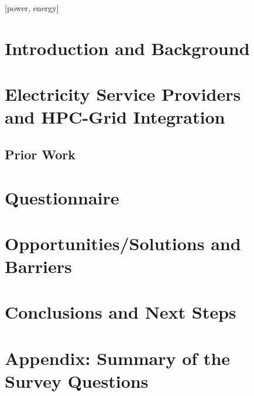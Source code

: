 \documentclass{../style/sig-alternate}
\begin{document}

[power, energy]



%
\section{Introduction and Background}

\label{sec:intro}

\section{Electricity Service Providers\\
 and HPC-Grid Integration}

\label{sec:supercomputer}

\subsection{Prior Work}

\label{sec:priorwork}

\section{Questionnaire} 

\label{sec:questionnaire}

%

\section{Opportunities/Solutions and\\ Barriers} 

\label{sec:opportunities}


\section{Conclusions and Next Steps}

\label{sec:conclusion}


%
%

%

%

\section{Appendix: Summary of the\\ Survey Questions}

\label{sec:surveysummary}
\end{document}
